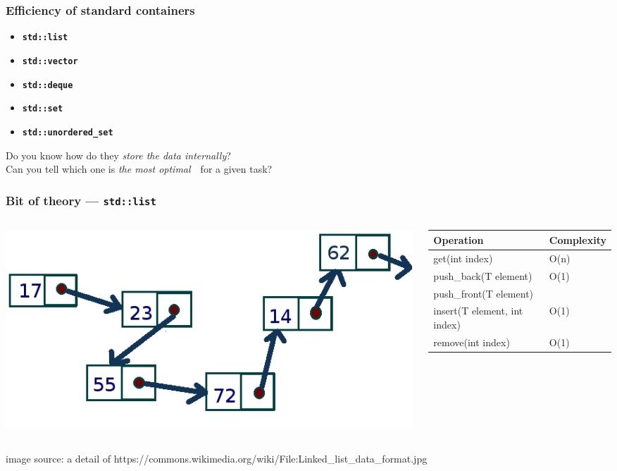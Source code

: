 \documentclass[aspectratio=169]{beamer}
\newcommand{\greenemph}[1]{\textit{\textcolor{clGreen}{#1}}}
\newcommand{\cpp}[1]{\texttt{\textbf{\textcolor{clCodeBlue}{#1}}}}
\newcommand\fontV{\fontsize{5}{5}\selectfont}
\newcommand\addsource[1]{\fontV\textcolor{clGray}{#1}}
\begin{document}
\begin{frame}
\frametitle{Efficiency of standard containers}
\begin{center}
  \begin{minipage}{0.4\textwidth}
    \begin{itemize}
      \item{} \cpp{std::list}
      \item{} \cpp{std::vector}
      \item{} \cpp{std::deque}
      \item{} \cpp{std::set}
      \item{} \cpp{std::unordered\_set}
    \end{itemize}
  \end{minipage}
\end{center}
\vspace*{16pt}
Do you know how do they \greenemph{store the data internally}?\\
\vspace*{12pt}
Can you tell which one is \greenemph{the most optimal}~~for a given task?
\end{frame}

\begin{frame}
\frametitle{Bit of theory --- \cpp{std::list}}
\begin{columns}
  \begin{column}{0.38\textwidth}
    \includegraphics[width=\textwidth]{pictures/Linked_list_layout.jpg} \\
  \end{column}\hfill%
  \begin{column}{0.58\textwidth}
    \begin{tabular}{|l|l|}
      \hline
      Operation & Complexity \\
      \hline\hline
      get(int index) & \textcolor{clRedFlag}{O(n)} \\
      \hline
      push\_back(T element) & O(1) \\
      push\_front(T element) & \\
      \hline
      insert(T element, int index) & \textcolor{clGreenFlag}{O(1)} \\
      \hline
      remove(int index) & O(1) \\
      \hline
    \end{tabular}
  \end{column}
\end{columns}
\vspace*{36pt}
\addsource{image source: a detail of https://commons.wikimedia.org/wiki/File:Linked\_list\_data\_format.jpg}
\end{frame}
\end{document}
